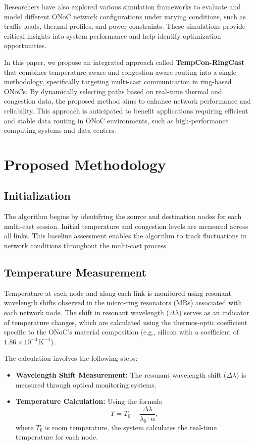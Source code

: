 \documentclass[conference]{IEEEtran}
\begin{document}
Researchers have also explored various simulation frameworks to evaluate and model different ONoC network configurations under varying conditions, such as traffic loads, thermal profiles, and power constraints. These simulations provide critical insights into system performance and help identify optimization opportunities.\cite{9720307}


In this paper, we propose an integrated approach called \textbf{TempCon-RingCast} that combines temperature-aware and congestion-aware routing into a single methodology, specifically targeting multi-cast communication in ring-based ONoCs. By dynamically selecting paths based on real-time thermal and congestion data, the proposed method aims to enhance network performance and reliability. This approach is anticipated to benefit applications requiring efficient and stable data routing in ONoC environments, such as high-performance computing systems and data centers.

\section{Proposed Methodology}

\subsection{Initialization}
The algorithm begins by identifying the source and destination nodes for each multi-cast session. Initial temperature and congestion levels are measured across all links. This baseline assessment enables the algorithm to track fluctuations in network conditions throughout the multi-cast process.

\subsection{Temperature Measurement}
Temperature at each node and along each link is monitored using resonant wavelength shifts observed in the micro-ring resonators (MRs) associated with each network node. The shift in resonant wavelength (\(\Delta \lambda\)) serves as an indicator of temperature changes, which are calculated using the thermos-optic coefficient specific to the ONoC’s material composition (e.g., silicon with a coefficient of \(1.86 \times 10^{-4} \, \mathrm{K}^{-1}\)).

The calculation involves the following steps:
\begin{itemize}
    \item \textbf{Wavelength Shift Measurement:} The resonant wavelength shift (\(\Delta \lambda\)) is measured through optical monitoring systems.
    \item \textbf{Temperature Calculation:} Using the formula
    \[
    T = T_0 + \frac{\Delta \lambda}{\lambda_0 \cdot \alpha},
    \]
    where \(T_0\) is room temperature, the system calculates the real-time temperature for each node.
\end{itemize}
\end{document}
